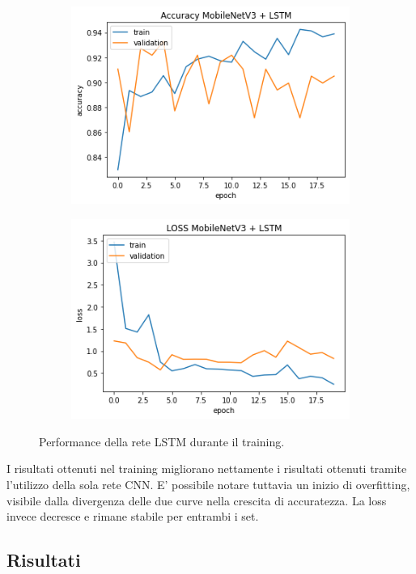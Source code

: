 \documentclass[11pt]{report}
\begin{document}
\begin{figure}[h]
\centering
	\begin{subfigure}[t]{.45\textwidth}
	\centering
    \includegraphics[scale = 0.5]{img/LSTM-accuracy.png}
	\end{subfigure}
	\quad
	\begin{subfigure}[t]{.45\textwidth}
	\centering
    \includegraphics[scale = 0.5]{img/LSTM-Loss.png}
	\end{subfigure}
	\quad
\caption{Performance della rete LSTM durante il training.}
\label{fig:train-LSTM}
\end{figure}


I risultati ottenuti nel training migliorano nettamente i risultati ottenuti tramite l'utilizzo della sola rete CNN. E' possibile notare tuttavia un inizio di overfitting, visibile dalla divergenza delle due curve nella crescita di accuratezza. La loss invece decresce e rimane stabile per entrambi i set.

\newpage

\subsection{Risultati}
\end{document}
